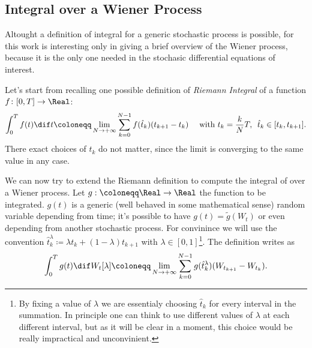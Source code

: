 \subsection{Integral over a Wiener Process}
Altought a definition of integral for a generic stochastic process is possible,
for this work is interesting only in giving a brief overview of the Wiener process,
because it is the only one needed in the stochasic differential equations of interest.

Let's start from recalling one possible definition of \emph{Riemann Integral} 
of a function \(f\colon[0,T]\to\Real\):
\[
  \int_0^T f{(t)}\dif t \coloneqq \lim_{N\to+\infty} \sum_{k=0}^{N-1}f{(\hat{t}_k)}(t_{k+1}-t_k)
  \quad \text{ with } t_k = \frac{k}{N}T,\,\,\, \hat{t}_k \in [t_k, t_{k+1}].
\]
There exact choices of \(\hat{t}_k\) do not matter, since the limit is converging 
to the same value in any case.

We can now try to extend the Riemann definition to compute the integral of over a Wiener
process. Let \(g:\coloneqq\Real\to\Real\) the function to be integrated. \(g{(t)}\) is a generic (well behaved in some mathematical sense)
random variable depending from time; it's possible to have \(g{(t)} = \tilde{g}{(W_t)}\) or even depending from another stochastic process.
For convinince we will use the convention 
\(\hat{t}_k^\lambda \coloneqq \lambda t_k + (1-\lambda) t_{k+1}\) with \(\lambda\in[0,1]\)\footnote{
  By fixing a value of \(\lambda\) we are essentialy choosing \(\hat{t}_k\) for every 
  interval in the summation. In principle one can think to use different values of \(\lambda\)
  at each different interval, but as it will be clear in a moment, this choice would be
  really impractical and unconvinient.
}. The definition writes as 
\[
  \int_0^T g{(t)}\dif W_t{[\lambda]} \coloneqq \lim_{N\to+\infty} \sum_{k=0}^{N-1}g{(\hat{t}_k^\lambda)}(W_{t_{k+1}}-W_{t_k}).
\]

